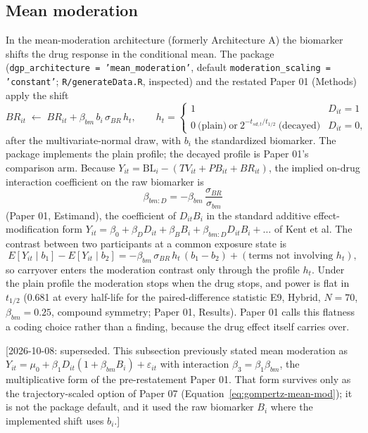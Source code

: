 \documentclass[11pt]{article}
\newcommand{\note}[1]{\textcolor{blue!60!black}{\small [#1]}}
\newcommand{\code}[1]{\texttt{#1}}
\begin{document}
\subsection{Mean moderation}

In the mean-moderation architecture (formerly Architecture A) the
biomarker shifts the drug response in the conditional mean. The
package (\code{dgp\_architecture = 'mean\_moderation'}, default
\code{moderation\_scaling = 'constant'}; \code{R/generateData.R},
inspected) and the restated Paper 01 (Methods) apply the shift
\begin{equation}
BR_{it} \;\leftarrow\; BR_{it} + \beta_{bm}\, b_i\, \sigma_{BR}\, h_t,
\qquad
h_t = \begin{cases}
  1 & D_{it} = 1 \\
  0 \ \text{(plain)} \ \text{or}\ 2^{-t_{sd,t}/t_{1/2}}
    \ \text{(decayed)} & D_{it} = 0,
\end{cases}
\label{eq:archA}
\end{equation}
after the multivariate-normal draw, with $b_i$ the standardized
biomarker. The package implements the plain profile; the decayed
profile is Paper 01's comparison arm. Because $Y_{it} = \mathrm{BL}_i
- (TV_{it} + PB_{it} + BR_{it})$, the implied on-drug interaction
coefficient on the raw biomarker is
\begin{equation}
\beta_{bm:D} = -\beta_{bm}\,\frac{\sigma_{BR}}{\sigma_{bm}}
\label{eq:archA-kent}
\end{equation}
(Paper 01, Estimand), the coefficient of $D_{it}B_i$ in the standard
additive effect-modification form $Y_{it} = \beta_0 + \beta_D D_{it} +
\beta_B B_i + \beta_{bm:D} D_{it} B_i + \ldots$ of Kent et al. The
contrast between two participants at a common exposure state is
\begin{equation}
E[Y_{it} \mid b_1] - E[Y_{it} \mid b_2] = -\beta_{bm}\,\sigma_{BR}\,
  h_t\,(b_1 - b_2) + (\text{terms not involving } h_t),
\label{eq:archA-contrast}
\end{equation}
so carryover enters the moderation contrast only through the profile
$h_t$. Under the plain profile the moderation stops when the drug
stops, and power is flat in $t_{1/2}$ (0.681 at every half-life for
the paired-difference statistic E9, Hybrid, $N=70$,
$\beta_{bm}=0.25$, compound symmetry; Paper 01, Results). Paper 01
calls this flatness a coding choice rather than a finding, because
the drug effect itself carries over.

\note{2026-10-08: superseded. This subsection previously stated mean
moderation as $Y_{it} = \mu_0 + \beta_1 D_{it}(1 + \beta_{bm}B_i) +
\varepsilon_{it}$ with interaction $\beta_3 = \beta_1\beta_{bm}$, the
multiplicative form of the pre-restatement Paper 01. That form survives only as
the trajectory-scaled option of Paper 07
(Equation~\eqref{eq:gompertz-mean-mod}); it is not the package default,
and it used the raw biomarker $B_i$ where the implemented shift uses
$b_i$.}
\end{document}
